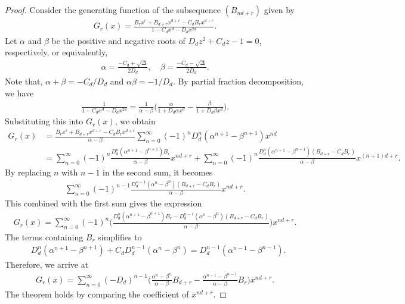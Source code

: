 \documentclass[12pt]{article}
\theoremstyle{plain}
\theoremstyle{definition}
\theoremstyle{remark}
\begin{document}
\begin{proof}
Consider the generating function of the subsequence $ (B_{nd + r}) $ given by
\begin{align*}
	G_r (x) = \frac{B_r x^r + B_{d + r} x^{d + r} - C_d B_r x^{d + r}}{1 - C_d x^d - D_d x^{2d}}.
\end{align*}
Let $ \alpha $ and $ \beta $ be the positive and negative roots of $ D_d z^2 + C_d z - 1 = 0 $, respectively, or equivalently,
\begin{align*}
	\alpha = \frac{-C_d + \sqrt{\Delta}}{2D_d}, \quad \beta = \frac{-C_d - \sqrt{\Delta}}{2D_d}.
\end{align*}
Note that, $ \alpha + \beta = -C_d/D_d $ and $ \alpha \beta = -1/D_d $. By partial fraction decomposition, we have
\begin{align*}
	\frac{1}{1 - C_d x^d - D_d x^{2d}} = \frac{1}{\alpha - \beta} \bigg( \frac{\alpha}{1 + D_d \alpha x^d} - \frac{\beta}{1 + D_d \beta x^d} \bigg).	
\end{align*}
Substituting this into $ G_r (x) $, we obtain
\begin{align*}
	G_r (x) &= \frac{B_r x^r + B_{d + r} x^{d + r} - C_d B_r x^{d + r}}{\alpha - \beta} \sum_{n = 0}^\infty (-1)^n D_d^n (\alpha^{n + 1} - \beta^{n + 1}) x^{nd} \\
	&= \sum_{n = 0}^\infty (-1)^n \frac{D_d^n (\alpha^{n + 1} - \beta^{n + 1}) B_r}{\alpha - \beta} x^{nd + r} + \sum_{n = 0}^\infty (-1)^n \frac{D_d^n (\alpha^{n + 1} - \beta^{n + 1}) (B_{d + r} - C_d B_r)}{\alpha - \beta} x^{(n + 1)d + r}. 
\end{align*}
By replacing $ n $ with $ n - 1 $ in the second sum, it becomes
\begin{align*}
	\sum_{n = 0}^\infty (-1)^{n - 1} \frac{D_d^{n - 1} (\alpha^n - \beta^n) (B_{d + r} - C_d B_r)}{\alpha - \beta} x^{nd + r}.
\end{align*}
This combined with the first sum gives the expression
\begin{align*}
	G_r (x) = \sum_{n = 0}^\infty (-1)^n \bigg( \frac{D_d^n (\alpha^{n + 1} - \beta^{n + 1}) B_r - D_d^{n - 1} (\alpha^n - \beta^n) (B_{d + r} - C_d B_r)}{\alpha - \beta} \bigg) x^{nd + r}.
\end{align*}
The terms containing $ B_r $ simplifies to
\begin{align*}
	&D_d^n (\alpha^{n + 1} - \beta^{n + 1}) + C_d D_d^{n - 1} (\alpha^n - \beta^n) = D_d^{n - 1} (\alpha^{n - 1} - \beta^{n - 1}).
\end{align*}
Therefore, we arrive at
\begin{align*}
	G_r (x) = \sum_{n = 0}^\infty (-D_d)^{n - 1} \bigg( \frac{\alpha^n - \beta^n}{\alpha - \beta} B_{d + r} - \frac{\alpha^{n - 1} - \beta^{n - 1}}{\alpha - \beta} B_r \bigg) x^{nd + r}.
\end{align*}
The theorem holds by comparing the coefficient of $ x^{nd + r} $.
\end{proof}
\end{document}
